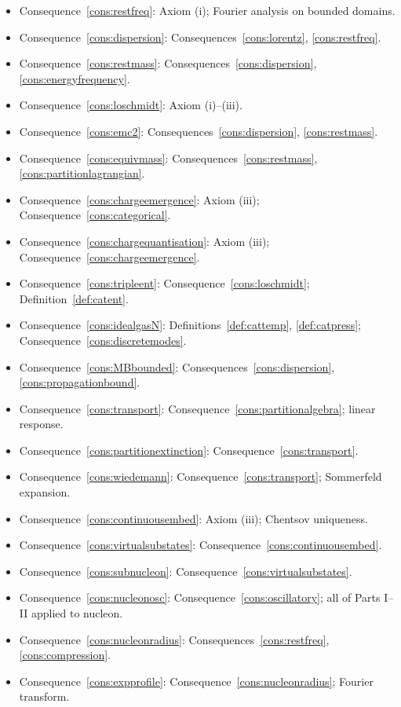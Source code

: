 \documentclass[11pt,twocolumn,a4paper]{article}
\theoremstyle{axiomstyle}
\theoremstyle{conseqstyle}
\theoremstyle{definition}
\theoremstyle{remark}
\begin{document}
\begin{itemize}
\item Consequence~\ref{cons:restfreq}: Axiom (i); Fourier analysis on bounded domains.
\item Consequence~\ref{cons:dispersion}: Consequences~\ref{cons:lorentz}, \ref{cons:restfreq}.
\item Consequence~\ref{cons:restmass}: Consequences~\ref{cons:dispersion}, \ref{cons:energyfrequency}.
\item Consequence~\ref{cons:loschmidt}: Axiom (i)--(iii).
\item Consequence~\ref{cons:emc2}: Consequences~\ref{cons:dispersion}, \ref{cons:restmass}.
\item Consequence~\ref{cons:equivmass}: Consequences~\ref{cons:restmass}, \ref{cons:partitionlagrangian}.
\item Consequence~\ref{cons:chargeemergence}: Axiom (iii); Consequence~\ref{cons:categorical}.
\item Consequence~\ref{cons:chargequantisation}: Axiom (iii); Consequence~\ref{cons:chargeemergence}.
\item Consequence~\ref{cons:tripleent}: Consequence~\ref{cons:loschmidt}; Definition~\ref{def:catent}.
\item Consequence~\ref{cons:idealgasN}: Definitions~\ref{def:cattemp}, \ref{def:catpress}; Consequence~\ref{cons:discretemodes}.
\item Consequence~\ref{cons:MBbounded}: Consequences~\ref{cons:dispersion}, \ref{cons:propagationbound}.
\item Consequence~\ref{cons:transport}: Consequence~\ref{cons:partitionalgebra}; linear response.
\item Consequence~\ref{cons:partitionextinction}: Consequence~\ref{cons:transport}.
\item Consequence~\ref{cons:wiedemann}: Consequence~\ref{cons:transport}; Sommerfeld expansion.
\item Consequence~\ref{cons:continuousembed}: Axiom (iii); Chentsov uniqueness.
\item Consequence~\ref{cons:virtualsubstates}: Consequence~\ref{cons:continuousembed}.
\item Consequence~\ref{cons:subnucleon}: Consequence~\ref{cons:virtualsubstates}.
\item Consequence~\ref{cons:nucleonosc}: Consequence~\ref{cons:oscillatory}; all of Parts I--II applied to nucleon.
\item Consequence~\ref{cons:nucleonradius}: Consequences~\ref{cons:restfreq}, \ref{cons:compression}.
\item Consequence~\ref{cons:expprofile}: Consequence~\ref{cons:nucleonradius}; Fourier transform.

\end{itemize}
\end{document}
